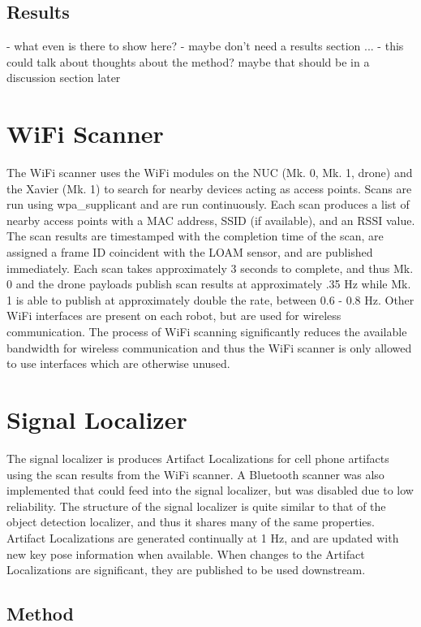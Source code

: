 \subsection{Results}

- what even is there to show here?
- maybe don't need a results section ...
- this could talk about thoughts about the method? maybe that should be in a discussion section later

\section{WiFi Scanner}

The WiFi scanner uses the WiFi modules on the NUC (Mk. 0, Mk. 1, drone) and the Xavier (Mk. 1) to search for nearby devices acting as access points. Scans are run using wpa\_supplicant and are run continuously. Each scan produces a list of nearby access points with a MAC address, SSID (if available), and an RSSI value. The scan results are timestamped with the completion time of the scan, are assigned a frame ID coincident with the LOAM sensor, and are published immediately. Each scan takes approximately 3 seconds to complete, and thus Mk. 0 and the drone payloads publish scan results at approximately .35 Hz while Mk. 1 is able to publish at approximately double the rate, between 0.6 - 0.8 Hz. Other WiFi interfaces are present on each robot, but are used for wireless communication. The process of WiFi scanning significantly reduces the available bandwidth for wireless communication and thus the WiFi scanner is only allowed to use interfaces which are otherwise unused.

\section{Signal Localizer}

The signal localizer is produces Artifact Localizations for cell phone artifacts using the scan results from the WiFi scanner. A Bluetooth scanner was also implemented that could feed into the signal localizer, but was disabled due to low reliability. The structure of the signal localizer is quite similar to that of the object detection localizer, and thus it shares many of the same properties. Artifact Localizations are generated continually at 1 Hz, and are updated with new key pose information when available. When changes to the Artifact Localizations are significant, they are published to be used downstream.

\subsection{Method}

